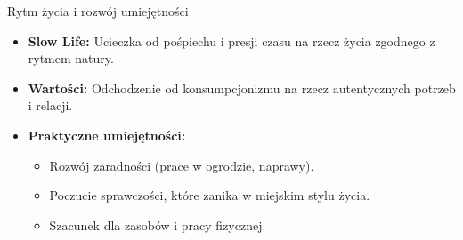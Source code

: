 \begin{frame}{Rytm życia i rozwój umiejętności}
    \begin{itemize}
        \item \textbf{Slow Life:} Ucieczka od pośpiechu i presji czasu na rzecz życia zgodnego z rytmem natury.
        \item \textbf{Wartości:} Odchodzenie od konsumpcjonizmu na rzecz autentycznych potrzeb i relacji.
        \item \textbf{Praktyczne umiejętności:}
        \begin{itemize}
            \item Rozwój zaradności (prace w ogrodzie, naprawy).
            \item Poczucie sprawczości, które zanika w miejskim stylu życia.
            \item Szacunek dla zasobów i pracy fizycznej.
        \end{itemize}
    \end{itemize}
\end{frame}
